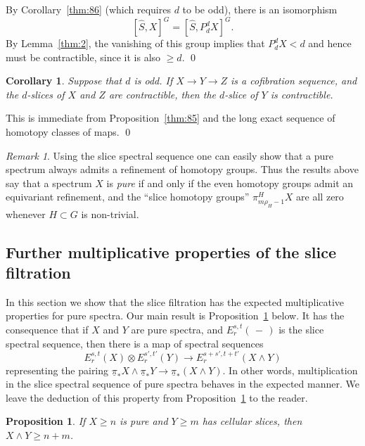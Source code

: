 \documentclass{amsart}
\newtheorem{cor}[equation]{Corollary}
\newtheorem{prop}[equation]{Proposition}
\newtheorem{rem}[equation]{Remark}
\theoremstyle{definition}
\theoremstyle{remark}
\newtheorem{rem}[equation]{Remark}
\newenvironment{pf}{\bigskip{\em Proof:\/}}{\qed\medskip}
\newcommand{\slot}{\,-\,}
\newcommand{\slc}[2]{P_{#1}^{#1}#2}
\newcommand{\pim}{\underline{\pi}}
\newcommand{\slicecell}{\widehat{S}}
\begin{document}
\begin{pf}
By Corollary~\ref{thm:86} (which requires $d$ to be odd), there is an
isomorphism
\[
[\slicecell,X]^{G}=[\slicecell,\slc{d}{X}]^{G}.
\]
By Lemma~\ref{thm:2}, the vanishing of this group implies that
$\slc{d}{X}<d$ and hence must be contractible, since it is also $\ge
d$.
\end{pf}

\begin{cor}
\label{thm:87} Suppose that $d$ is odd.  If $X\to Y\to Z$ is a
cofibration sequence, and the $d$-slices of $X$ and $Z$ are
contractible, then the $d$-slice of $Y$ is contractible.
\end{cor}

\begin{pf}
This is immediate from Proposition~\ref{thm:85} and the long exact
sequence of homotopy classes of maps.
\end{pf}


\begin{rem}
\label{rem:48} Using the slice spectral sequence one can easily show
that a pure spectrum always admits a refinement of homotopy groups.
Thus the results above say that a spectrum $X$ is {\em pure} if and
only if the even homotopy groups admit an equivariant refinement, and
the ``slice homotopy groups'' $\pi^{H}_{m\rho_{H}-1}X$ are all zero
whenever $H\subset G$ is non-trivial.
\end{rem}

\subsection{Further multiplicative properties of the slice filtration}
\label{sec:furth-mult-prop}

In this section we show that the slice filtration has the expected
multiplicative properties for pure spectra.  Our main result is
Proposition~\ref{thm:179} below.  It has the consequence that if $X$
and $Y$ are pure spectra, and $E_{r}^{s,t}(\slot)$ is the slice
spectral sequence, then there is a map of spectral sequences
\[
E_{r}^{s,t}(X)\otimes E_{r}^{s',t'}(Y) \to E_{r}^{s+s', t+t'}(X\wedge Y)
\]
representing the pairing $\pim_{\ast}X\wedge \pim_{\ast}Y\to
\pim_{\ast}(X\wedge Y)$.  In other words, multiplication in the slice
spectral sequence of pure spectra behaves in the expected manner.
We leave the deduction of this property from Proposition~\ref{thm:179}
to the reader.

\begin{prop}
\label{thm:179}
If $X\ge n$ is pure and $Y\ge m$ has cellular slices, then $X\wedge
Y\ge n+m$.
\end{prop}
\end{document}
